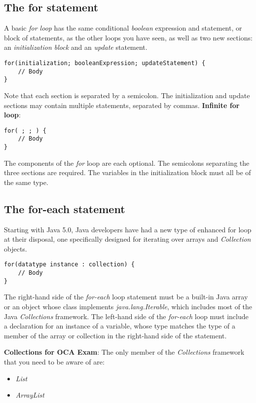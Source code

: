 \documentclass{article}
\begin{document}
\subsection{The for statement}
A basic \emph{for loop} has the same conditional \emph{boolean} expression and statement, or block of statements, as the other loops you have seen, as well as two new sections: an \emph{initialization block} and an \emph{update} statement.

\begin{lstlisting}
for(initialization; booleanExpression; updateStatement) {
	// Body
}
\end{lstlisting}
Note that each section is separated by a semicolon. The initialization and update sections may contain multiple statements, separated by commas.
\textbf{Infinite for loop}:
\begin{lstlisting}
for( ; ; ) {
	// Body
}
\end{lstlisting}
The components of the \emph{for} loop are each optional. The semicolons separating the three sections are required.
The variables in the initialization block must all be of the same type.
\subsection{The for-each statement}
Starting with Java 5.0, Java developers have had a new type of enhanced for loop at their disposal, one specifically designed for iterating over arrays and \emph{Collection} objects.
\begin{lstlisting}
for(datatype instance : collection) {
	// Body
}
\end{lstlisting}

The right-hand side of the \emph{for-each} loop statement must be a built-in Java array or an object whose class implements \emph{java.lang.Iterable}, which includes most of the Java \emph{Collections} framework.
The left-hand side of the \emph{for-each} loop must include a declaration for an instance of a variable, whose type matches the type of a member of the array or collection in the right-hand side of the statement.

\textbf{Collections for OCA Exam}: The only member of the \emph{Collections} framework that you need to be aware of are:
\begin{itemize}
	\item \emph{List}
	\item \emph{ArrayList}
\end{itemize}
\end{document}
